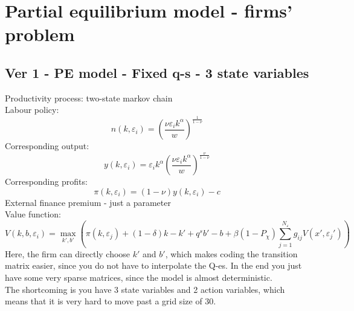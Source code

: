 \documentclass[12pt]{article}
\begin{document}
\section*{Partial equilibrium model - firms' problem}
\subsection*{Ver 1 - PE model - Fixed q-s - 3 state variables}
Productivity process: two-state markov chain \vspace{3mm} \\
Labour policy: 
\begin{equation}
    n(k,\varepsilon_i) = \left( \dfrac{ \nu \varepsilon_i k^\alpha}{w} \right)^{\frac{1}{1-\nu}}
\end{equation}
Corresponding output: 
\begin{equation}
    y(k,\varepsilon_i) = \varepsilon_i k^{\alpha} \left( \dfrac{\nu \varepsilon_i k^\alpha}{w} \right)^{\frac{\nu}{1-\nu}}
\end{equation}
Corresponding profits: 
\begin{equation}
    \pi(k,\varepsilon_i) = (1-\nu) y(k,\varepsilon_i) - c
\end{equation}
External finance premium - just a parameter \vspace{2mm} \\
Value function:
\begin{equation}
     V(k,b, \varepsilon_i) = \max_{k',b'}  \left( \pi(k,\varepsilon_j)+(1-\delta)k - k' +  q^s b' -b  +
            \beta (1-P_\chi) \sum_{j=1}^{N_\varepsilon} g_{ij}  V(x',\varepsilon_j') \right)
\end{equation}
\noindent Here, the firm can directly choose $k'$ and $b'$, which makes coding the transition matrix easier, since you do not have to interpolate the Q-es. In the end you just have some very sparse matrices, since the model is almost deterministic. \vspace{3mm} \\
The shortcoming is you have 3 state variables and 2 action variables, which means that it is very hard to move past a grid size of 30. 

\newpage
\setcounter{equation}{0}
\end{document}
